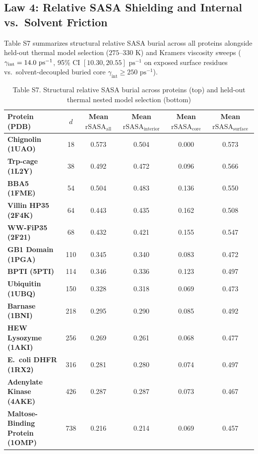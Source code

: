 \documentclass[10pt,letterpaper]{article}
\begin{document}
\subsection{Law 4: Relative SASA Shielding and Internal vs.\ Solvent Friction}
Table S7 summarizes structural relative SASA burial across all \vFourNumProteins{} proteins alongside held-out thermal model selection ($275\text{--}330\text{ K}$) and Kramers viscosity sweeps ($\gamma_{\mathrm{int}} = 14.0{}\text{ ps}^{-1}$, 95\% CI $[10.30, 20.55]\text{ ps}^{-1}$ on exposed surface residues vs.\ solvent-decoupled buried core $\gamma_{\mathrm{int}} \ge 250\text{ ps}^{-1}$).

\begin{table}[!htbp]
\centering
\caption*{Table S7. Structural relative SASA burial across \vFourNumProteins{} proteins (top) and held-out thermal nested model selection (bottom)}
\footnotesize
\renewcommand{\arraystretch}{1.10}
\setlength{\tabcolsep}{5.0pt}
\begin{tabular}{@{}l c c c c c@{}}
\toprule[1.1pt]
\textbf{Protein (PDB)} & \textbf{$d$} & \textbf{Mean $\mathrm{rSASA}_{\mathrm{all}}$} & \textbf{Mean $\mathrm{rSASA}_{\mathrm{interior}}$} & \textbf{Mean $\mathrm{rSASA}_{\mathrm{core}}$} & \textbf{Mean $\mathrm{rSASA}_{\mathrm{surface}}$} \\
\midrule[0.6pt]
\textbf{Chignolin (1UAO)} & 18 & 0.573 & 0.504 & 0.000 & 0.573 \\
\textbf{Trp-cage (1L2Y)} & 38 & 0.492 & 0.472 & 0.096 & 0.566 \\
\textbf{BBA5 (1FME)} & 54 & 0.504 & 0.483 & 0.136 & 0.550 \\
\textbf{Villin HP35 (2F4K)} & 64 & 0.443 & 0.435 & 0.162 & 0.508 \\
\textbf{WW-FiP35 (2F21)} & 68 & 0.432 & 0.421 & 0.155 & 0.547 \\
\textbf{GB1 Domain (1PGA)} & 110 & 0.345 & 0.340 & 0.083 & 0.472 \\
\textbf{BPTI (5PTI)} & 114 & 0.346 & 0.336 & 0.123 & 0.497 \\
\textbf{Ubiquitin (1UBQ)} & 150 & 0.328 & 0.318 & 0.069 & 0.473 \\
\textbf{Barnase (1BNI)} & 218 & 0.295 & 0.290 & 0.085 & 0.492 \\
\textbf{HEW Lysozyme (1AKI)} & 256 & 0.269 & 0.261 & 0.068 & 0.477 \\
\textbf{E.\ coli DHFR (1RX2)} & 316 & 0.281 & 0.280 & 0.074 & 0.497 \\
\textbf{Adenylate Kinase (4AKE)} & 426 & 0.287 & 0.287 & 0.073 & 0.467 \\
\textbf{Maltose-Binding Protein (1OMP)} & 738 & 0.216 & 0.214 & 0.069 & 0.457 \\
\bottomrule[1.1pt]
\end{tabular}


\end{table}
\end{document}
